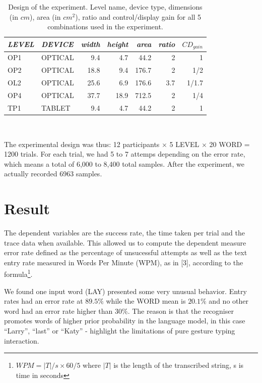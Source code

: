 \documentclass{chi-ext}
\newcommand{\smit}[1]{{\small\textit{{#1}}}}
\newcommand{\cdt}[1]{{\small\uppercase{{#1}}}}
\begin{document}
\begin{table}
  \centering
  \begin{tabular}{l l | r r r r r}
    \smit{LEVEL} & \smit{DEVICE} & \smit{width} & \smit{height} & \smit{area}& \smit{ratio} & \smit{$CD_{gain}$} \\
    \hline
    \cdt{OP1} & \cdt{optical} & 9.4 & 4.7 & 44.2 & 2 & 1 \\
    \cdt{OP2} & \cdt{optical} & 18.8 & 9.4 & 176.7 & 2 & 1/2 \\
    \cdt{OL2} & \cdt{optical} & 25.6 & 6.9 & 176.6 & 3.7 & 1/1.7 \\
    \cdt{OP4} & \cdt{optical} & 37.7 & 18.9 & 712.5 & 2 & 1/4 \\
    \hline
    \cdt{tp1} & \cdt{tablet} & 9.4 & 4.7 & 44.2 & 2 & 1 \\
  \end{tabular}
  \caption{Design of the experiment. Level name, device type, dimensions (in $cm$), area (in $cm^2$), ratio and control/display gain for all 5 combinations used in the experiment.}~\label{tab:cdt}
\end{table}

The experimental design was thus: 12 participants $\times$ 5 \cdt{level} $\times$ 20 \cdt{word} = 1200 trials. For each trial, we had 5 to 7 attemps depending on the error rate, which means a total of 6,000 to 8,400 total samples. After the experiment, we actually recorded 6963 samples.

\section{Result}
The dependent variables are the success rate, the time taken per trial and the trace data when available. This allowed us to compute the dependent measure error rate defined as the percentage of unsucessful attempts as well as the text entry rate measured in Words Per Minute (WPM), as in [3], according to the formula\footnote{$WPM = |T|/s \times 60/5$ where $|T|$ is the length of the transcribed string, s is time in seconds}.

We found one input word (\cdt{lay}) presented some very unusual behavior. Entry rates had an error rate at $89.5\%$ while the WORD mean is $20.1\%$ and no other word had an error rate higher than $30\%$. The reason is that the recogniser promotes words of higher prior probability in the language model, in this case “Larry”, “last” or “Katy” - highlight the limitations of pure gesture typing interaction.
\end{document}
